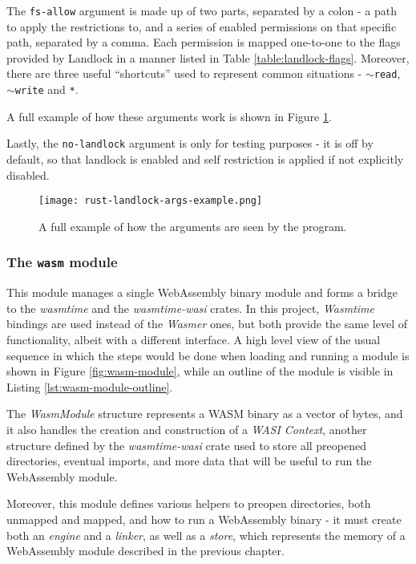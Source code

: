 The \texttt{fs-allow} argument is made up of two parts, separated by a colon - a path to apply the restrictions to,
and a series of enabled permissions on that specific path, separated by a comma.
Each permission is mapped one-to-one to the flags provided by Landlock in a manner listed in Table \ref{table:landlock-flags}.
Moreover, there are three useful ``shortcuts'' used to represent common situations - \texttt{$\sim$read}, \texttt{$\sim$write} and \texttt{*}.

A full example of how these arguments work is shown in Figure \ref{fig:args-example}.

Lastly, the \texttt{no-landlock} argument is only for testing purposes - it is off by default, so that
landlock is enabled and self restriction is applied if not explicitly disabled.

\begin{figure}[ht]
  \centering
  \texttt{[image: rust-landlock-args-example.png]}
  \caption{A full example of how the arguments are seen by the program.}
  \label{fig:args-example}
\end{figure}

\subsubsection{The \texttt{wasm} module}
\label{sec:landlock-wasm-module}

This module manages a single WebAssembly binary module and forms a bridge to the \textit{wasmtime} and the \textit{wasmtime-wasi}
crates. In this project, \textit{Wasmtime} bindings are used instead of the \textit{Wasmer} ones, but both provide the
same level of functionality, albeit with a different interface. A high level view of the usual sequence in which the steps would be done
when loading and running a module is shown in Figure \ref{fig:wasm-module}, while an outline of the module is visible
in Listing \ref{lst:wasm-module-outline}.

The \textit{WasmModule} structure represents a WASM binary as a vector of bytes, and it also handles the creation
and construction of a \textit{WASI Context}, another structure defined by the \textit{wasmtime-wasi} crate used to store
all preopened directories, eventual imports, and more data that will be useful to run the WebAssembly module.

Moreover, this module defines various helpers to preopen directories, both unmapped and mapped, and
how to run a WebAssembly binary - it must create both an \textit{engine} and a \textit{linker},
as well as a \textit{store}, which represents the memory of a WebAssembly module described in the previous chapter.

